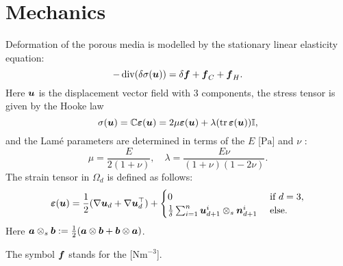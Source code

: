 \section{Mechanics}
\def\ee{\vc\varepsilon}
\newcommand{\eq}[1]{\begin{equation}#1\end{equation}}
\def\nn{\vc n}
\def\tr{\operatorname{tr}}
\def\uu{\vc u}

Deformation of the porous media is modelled by the stationary linear elasticity equation:
\eq{\label{eq:lin_el} -\div(\delta\tn \sigma(\uu)) = \delta\vc f + \vc f_C + \vc f_H. }
Here $\uu$  is the displacement vector field with 3 components, the stress tensor is given by the Hooke law
\eq{ \tn\sigma(\uu) = \tn C\ee(\uu) = 2\mu\ee(\uu) + \lambda(\tr\ee(\uu))\tn I, }
and the Lam\'e parameters are determined in terms of the  $E$ [$\mathrm{Pa}$] and  $\nu$ \units{}{}{}:
\eq{ \mu = \frac{E}{2(1+\nu)},\quad \lambda = \frac{E\nu}{(1+\nu)(1-2\nu)}. }
The strain tensor in $\Omega_d$ is defined as follows:
\eq{ \ee(\uu) = \frac12(\nabla\uu_d+\nabla\uu_d^\top) + \begin{cases}0&\mbox{ if }d=3,\\\frac1\delta\sum_{i=1}^n\uu_{d+1}^i\otimes_s\nn_{d+1}^i & \mbox{ else}.\end{cases} }
Here $\mathbf{\boldsymbol{a}}\otimes_s\mathbf{\boldsymbol{b}}:=\frac12(\mathbf{\boldsymbol{a}}\otimes\mathbf{\boldsymbol{b}}+\mathbf{\boldsymbol{b}}\otimes\mathbf{\boldsymbol{a}})$.

The symbol $\mathbf{\boldsymbol{f}}$ stands for the  [$\mathrm{Nm}^{-3}$].


